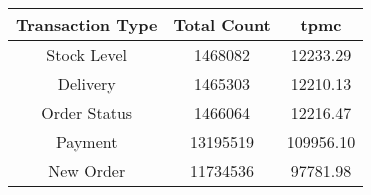 \documentclass[../../main.tex]{subfiles}
\begin{document}
\begin{minipage}{.5\textwidth}
    \end{minipage}
    \begin{minipage}{.5\textwidth}
        \begin{center}
            \begin{tabular}{ |c|c|c| } 
                \hline
                Transaction Type & Total Count & tpmc\\
                \hline
                Stock Level & 1468082 & 12233.29 \\
                Delivery & 1465303 & 12210.13 \\
                Order Status & 1466064 & 12216.47 \\
                Payment & 13195519 & 109956.10 \\
                New Order & 11734536 & 97781.98 \\
                \hline
            \end{tabular}
        \end{center}
    \end{minipage}
\end{document}
